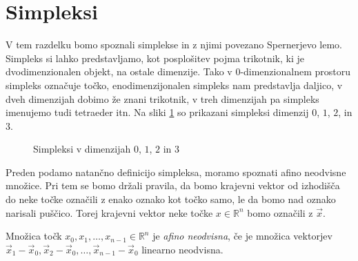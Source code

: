\documentclass[mat1]{fmfdelo}
\newcommand{\R}{\mathbb R}
\newcommand{\0}{\underline{0}}
\begin{document}
\section{Simpleksi}
V tem razdelku bomo spoznali simplekse in z njimi povezano Spernerjevo lemo. Simpleks si lahko predstavljamo, kot posplošitev pojma trikotnik, ki je dvodimenzionalen objekt, na ostale dimenzije. Tako v $0$-dimenzionalnem prostoru simpleks označuje točko, enodimenzijonalen simpleks nam predstavlja daljico, v dveh dimenzijah dobimo že znani trikotnik, v treh dimenzijah pa simpleks imenujemo tudi tetraeder itn. Na sliki \ref{fig:simplex} so prikazani simpleksi dimenzij $0$, $1$, $2$, in $3$.
\begin{figure}[h!]  %
	\centering
	\caption{Simpleksi v dimenzijah $0$, $1$, $2$ in $3$}\label{fig:simplex}
\end{figure}
 Preden podamo natančno definicijo simpleksa, moramo spoznati afino neodvisne množice. Pri tem se bomo držali pravila, da bomo krajevni vektor od izhodišča do neke točke označili z enako oznako kot točko samo, le da bomo nad oznako narisali puščico. Torej krajevni vektor neke točke $x \in \R^n$ bomo označili z $\vec{x}$.
\begin{definicija}
Množica točk $x_0, x_1, \dots , x_{n-1} \in \R^n$ je \emph{afino neodvisna}, če je množica vektorjev $\vec{x}_1 - \vec{x}_0, \vec{x}_2 - \vec{x}_0, \dots , \vec{x}_{n-1} - \vec{x}_0$ linearno neodvisna.
\end{definicija}
\end{document}
